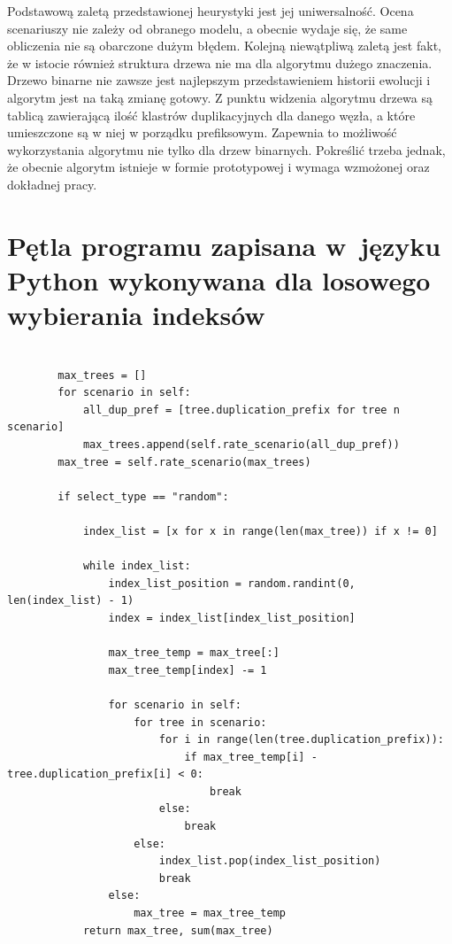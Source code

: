 \documentclass[licencjacka]{pracamgr}
\begin{document}
Podstawową zaletą przedstawionej heurystyki jest jej uniwersalność. Ocena scenariuszy nie zależy od obranego modelu, a obecnie wydaje się, że same obliczenia nie są obarczone dużym błędem. Kolejną niewątpliwą zaletą jest fakt, że w istocie również struktura drzewa nie ma dla algorytmu dużego znaczenia. Drzewo binarne nie zawsze jest najlepszym przedstawieniem historii ewolucji i algorytm jest na taką zmianę gotowy. Z punktu widzenia algorytmu drzewa są tablicą zawierającą ilość klastrów duplikacyjnych dla danego węzła, a które umieszczone są w niej w porządku prefiksowym. Zapewnia to możliwość wykorzystania algorytmu nie tylko dla drzew binarnych. Pokreślić trzeba jednak, że obecnie algorytm istnieje w formie prototypowej i wymaga wzmożonej oraz dokładnej pracy.  

\appendix

\chapter{Pętla programu zapisana w~języku Python wykonywana dla losowego wybierania indeksów}

\begin{verbatim}

		max_trees = []
        for scenario in self:
            all_dup_pref = [tree.duplication_prefix for tree n scenario]
            max_trees.append(self.rate_scenario(all_dup_pref))
        max_tree = self.rate_scenario(max_trees)

        if select_type == "random":

            index_list = [x for x in range(len(max_tree)) if x != 0]

            while index_list:
                index_list_position = random.randint(0, len(index_list) - 1)
                index = index_list[index_list_position]

                max_tree_temp = max_tree[:]
                max_tree_temp[index] -= 1

                for scenario in self:
                    for tree in scenario:
                        for i in range(len(tree.duplication_prefix)):
                            if max_tree_temp[i] - tree.duplication_prefix[i] < 0:
                                break
                        else:
                            break
                    else:
                        index_list.pop(index_list_position)
                        break
                else:
                    max_tree = max_tree_temp
            return max_tree, sum(max_tree)
\end{verbatim}
\end{document}
